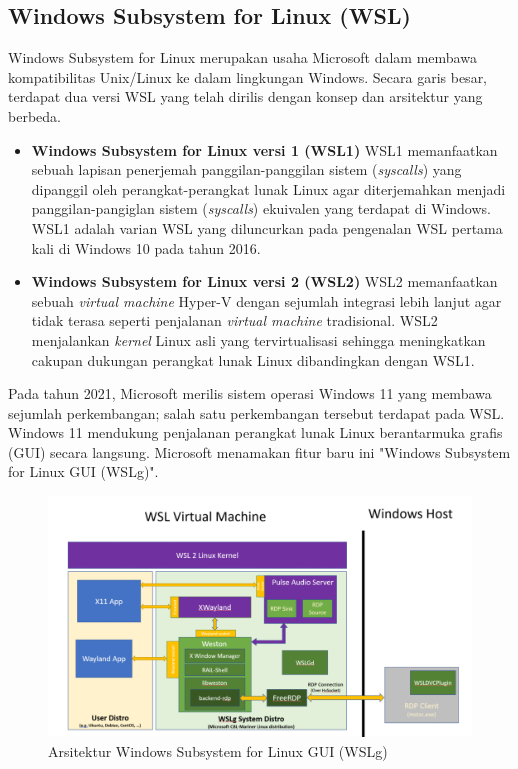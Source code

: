 \subsection{Windows Subsystem for Linux (WSL)}

Windows Subsystem for Linux merupakan usaha Microsoft dalam membawa kompatibilitas Unix/Linux ke dalam lingkungan Windows. Secara garis besar, terdapat dua versi WSL yang telah dirilis dengan konsep dan arsitektur yang berbeda.
\begin{itemize}
    \item \textbf{Windows Subsystem for Linux versi 1 (WSL1)}
    WSL1 memanfaatkan sebuah lapisan penerjemah panggilan-panggilan sistem (\textit{syscalls}) yang dipanggil oleh perangkat-perangkat lunak Linux agar diterjemahkan menjadi panggilan-pangiglan sistem (\textit{syscalls}) ekuivalen yang terdapat di Windows. WSL1 adalah varian WSL yang diluncurkan pada pengenalan WSL pertama kali di Windows 10 pada tahun 2016.

    \item \textbf{Windows Subsystem for Linux versi 2 (WSL2)}
    WSL2 memanfaatkan sebuah \textit{virtual machine} Hyper-V dengan sejumlah integrasi lebih lanjut agar tidak terasa seperti penjalanan \textit{virtual machine} tradisional. WSL2 menjalankan \textit{kernel} Linux asli yang tervirtualisasi sehingga meningkatkan cakupan dukungan perangkat lunak Linux dibandingkan dengan WSL1.
\end{itemize}


Pada tahun 2021, Microsoft merilis sistem operasi Windows 11 yang membawa sejumlah perkembangan; salah satu perkembangan tersebut terdapat pada WSL. Windows 11 mendukung penjalanan perangkat lunak Linux berantarmuka grafis (GUI) secara langsung. Microsoft menamakan fitur baru ini "Windows Subsystem for Linux GUI (WSLg)".

\begin{figure}
    \centering
    \includegraphics[width=1\linewidth]{assets/wslg-architecture.png}
    \caption{Arsitektur Windows Subsystem for Linux GUI (WSLg) \cite{wslg-architecture}}
\end{figure}

